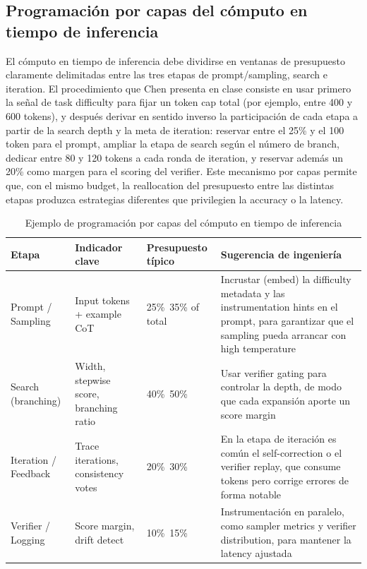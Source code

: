 \documentclass[a4paper]{article}
\begin{document}
\subsection{Programación por capas del cómputo en tiempo de inferencia}
El cómputo en tiempo de inferencia debe dividirse en ventanas de presupuesto claramente delimitadas entre las tres etapas de prompt/sampling, search e iteration. El procedimiento que Chen presenta en clase consiste en usar primero la señal de task difficulty para fijar un token cap total (por ejemplo, entre 400 y 600 tokens), y después derivar en sentido inverso la participación de cada etapa a partir de la search depth y la meta de iteration: reservar entre el 25\% y el 100 token para el prompt, ampliar la etapa de search según el número de branch, dedicar entre 80 y 120 tokens a cada ronda de iteration, y reservar además un 20\% como margen para el scoring del verifier. Este mecanismo por capas permite que, con el mismo budget, la reallocation del presupuesto entre las distintas etapas produzca estrategias diferentes que privilegien la accuracy o la latency.

\begin{table}[H]
\centering
\caption{Ejemplo de programación por capas del cómputo en tiempo de inferencia}
\begin{tabular}{p{}p{}p{}p{}}
\toprule
Etapa & Indicador clave & Presupuesto típico & Sugerencia de ingeniería \\
\midrule
Prompt / Sampling & Input tokens + example CoT & 25\%~35\% of total & Incrustar (embed) la difficulty metadata y las instrumentation hints en el prompt, para garantizar que el sampling pueda arrancar con high temperature \\
Search (branching) & Width, stepwise score, branching ratio & 40\%~50\% & Usar verifier gating para controlar la depth, de modo que cada expansión aporte un score margin \\
Iteration / Feedback & Trace iterations, consistency votes & 20\%~30\% & En la etapa de iteración es común el self-correction o el verifier replay, que consume tokens pero corrige errores de forma notable \\
Verifier / Logging & Score margin, drift detect & 10\%~15\% & Instrumentación en paralelo, como sampler metrics y verifier distribution, para mantener la latency ajustada \\
\bottomrule
\end{tabular}
\end{table}
\end{document}
